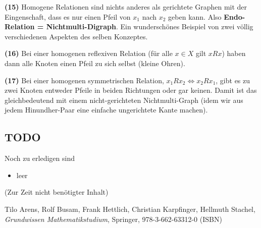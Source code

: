 \documentclass[a4paper]{amsart}
\theoremstyle{definition}
\begin{document}
\textbf{(15)} Homogene Relationen sind nichts anderes als gerichtete Graphen mit der Eingenschaft, dass es nur einen Pfeil von $x_1$ nach $x_2$ geben kann. Also \textbf{Endo-Relation = Nichtmulti-Digraph}. Ein wunderschönes Beispiel von zwei völlig verschiedenen Aspekten des selben Konzeptes.

\textbf{(16)} Bei einer homogenen reflexiven Relation (für alle $x\in X$ gilt $xRx$) haben dann alle Knoten einen Pfeil zu sich selbst (kleine Ohren).

\textbf{(17)} Bei einer homogenen symmetrischen Relation, $x_1Rx_2 \Leftrightarrow x_2Rx_1$, gibt es zu zwei Knoten entweder Pfeile in beiden Richtungen oder gar keinen. Damit ist das gleichbedeutend mit einem nicht-gerichteten Nichtmulti-Graph (idem wir aus jedem Hinundher-Paar eine einfache ungerichtete Kante machen).

\begin{backup}
\section{TODO}
Noch zu erledigen sind
\begin{itemize}
   \item leer
\end{itemize}
\end{backup}

\begin{backup}
    (Zur Zeit nicht benötigter Inhalt)
\end{backup}

\begin{thebibliography}{9}

      Tilo Arens, Rolf Busam, Frank Hettlich, Christian Karpfinger, Hellmuth Stachel, \emph{Grundwissen Mathematikstudium},
      Springer, 978-3-662-63312-0 (ISBN)
      
\end{thebibliography}
\end{document}

